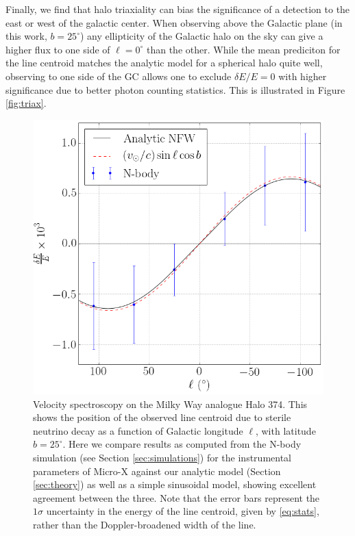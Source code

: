 \documentclass[aps,prd,10pt,twocolumn,superscriptaddress,showpacs]{revtex4-1}
\begin{document}
Finally, we find that halo triaxiality can bias the significance of a detection to
the east or west of the galactic center. When observing above the Galactic plane (in this work,
$b=25^\circ$) any ellipticity of the Galactic halo on the sky can give a higher flux to one side of
$\ell=0^\circ$ than the other. While the mean prediciton for the line centroid matches the analytic model
for a spherical halo quite well, observing to one side of the GC allows one to exclude $\delta
E/E=0$ with higher significance due to better photon counting statistics. This is illustrated in Figure \ref{fig:triax}.

\begin{figure}[h!]
\centering
\includegraphics[width=1.0\columnwidth]{de_vs_l.png}
\caption{Velocity spectroscopy on the Milky Way analogue Halo 374. This shows the position of the observed line centroid due to sterile
	neutrino decay as a function of Galactic longitude $\ell$, with latitude $b=25^\circ$.
	Here we compare results as computed from the N-body simulation (see Section \ref{sec:simulations}) for the
	instrumental parameters of Micro-X against our analytic model (Section
	\ref{sec:theory}) as well as a simple sinusoidal model, showing excellent agreement between the
	three. Note that the error bars represent the $1\sigma$ uncertainty
in the energy of the line centroid, given by \eqref{eq:stats}, rather than the Doppler-broadened width of the line.}
\label{fig:de_vs_l}
\end{figure}
\end{document}
